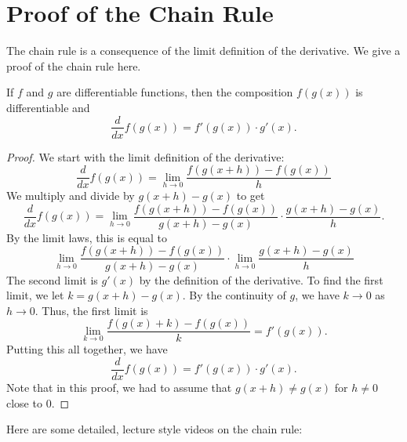 \documentclass[handout]{ximera}
\begin{document}
\section{Proof of the Chain Rule}
The chain rule is a consequence of the limit definition of the derivative.  
We give a proof of the chain rule here.  
\begin{theorem}
If $f$ and $g$ are differentiable functions, then the composition $f(g(x))$ is differentiable and
\[\frac{d}{dx} f(g(x)) = f'(g(x)) \cdot g'(x).\]
\end{theorem} 
\begin{proof}
We start with the limit definition of the derivative:
\[
\frac{d}{dx} f(g(x)) = \lim_{h \to 0} \frac{f(g(x+h)) - f(g(x))}{h}
\]
We multiply and divide by $g(x+h) - g(x)$ to get
\[
\frac{d}{dx} f(g(x)) = \lim_{h \to 0} \frac{f(g(x+h)) - f(g(x))}{g(x+h) - g(x)} \cdot \frac{g(x+h) - g(x)}{h}.
\]
By the limit laws, this is equal to 
\[\lim_{h \to 0} \frac{f(g(x+h)) - f(g(x))}{g(x+h) - g(x)} \cdot \lim_{h \to 0} \frac{g(x+h) - g(x)}{h}\]
The second limit is $g'(x)$ by the definition of the derivative.  
To find the first limit, we let $k = g(x+h) - g(x)$. By the continuity of $g$, we have $k \to 0$ as $h \to 0$.
Thus, the first limit is
\[
\lim_{k \to 0} \frac{f(g(x) + k) - f(g(x))}{k} = f'(g(x)).
\]
Putting this all together, we have
\[
\frac{d}{dx} f(g(x)) = f'(g(x)) \cdot g'(x).
\]
Note that in this proof, we had to assume that $g(x+h) \neq g(x)$ for $h \neq 0$ close to $0$. 
\end{proof} 

Here are some detailed, lecture style videos on the chain rule:
\begin{foldable}
\end{foldable}
\end{document}
